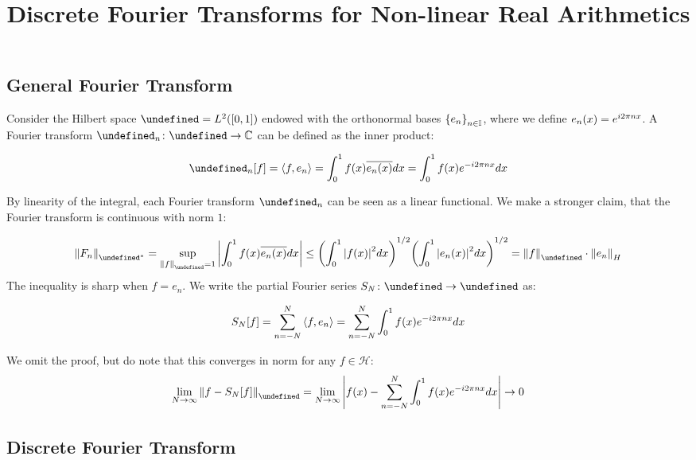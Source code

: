 \documentclass[12pt]{article}
\author{}
\title{Discrete Fourier Transforms for Non-linear Real Arithmetics}
\date{}
\let\H\undefined
\newcommand{\H}{\mathcal{H}}
\let\F\undefined
\newcommand{\F}{\mathcal{F}}
\begin{document}
\maketitle

\subsection*{General Fourier Transform}
Consider the Hilbert space $\H = L^2 \parens{\brackets{0, 1}}$ endowed with
the orthonormal bases ${\left\{e_n\right\}}_{n \in {\mathbb{I}}}$, where we define
$e_n {\left(x\right)} = e^{i 2\pi n x}$.
A Fourier transform $\type{\F_n}{\H}{\C}$ can be defined as the inner product:

\begin{align*}
  \F_n\brackets{f}
    = \inner{f, e_n}
    = \int_0^1 f\parens{x} \overline{e_n \parens{x}} dx
    = \int_0^1 f\parens{x} e^{-i 2 \pi n x} dx
\end{align*}

By linearity of the integral, each Fourier transform $\F_n$
can be seen as a linear functional.
We make a stronger claim, that the Fourier transform is continuous with
norm $1$:

\begin{align*}
  \norm{F_n}_{\adj{\H}}
    = \sup_{\norm{f}_{\H} = 1}
        \abs{\int_0^1 f\parens{x} \overline{e_n \parens{x}} dx}
    \leq \parens{\int_0^1 \abs{f\parens{x}}^2 dx}^{1/2}
              \parens{\int_0^1 \abs{e_n \parens{x}}^2 dx}^{1/2}
    = \norm{f}_{\H} \cdot \norm{e_n}_{H}
\end{align*}
The inequality is sharp when $f = e_{n}$.
We write the partial Fourier series $\type{S_N}{\H}{\H}$ as:

\begin{align*}
  S_N {\left[f\right]}
    = \sum_{n = -N}^{N} {\left\langle f, e_n\right\rangle}
    = \sum_{n = -N}^{N} \int_0^1 f(x) e^{- i 2 \pi n x} dx
\end{align*}

We omit the proof, but do note that this converges in norm for any
$f \in \mathcal{H}$:
\begin{align*}
  \lim_{N \to \infty} \norm{f - S_N \brackets{f}}_{\H}
    = \lim_{N \to \infty}
      \abs{f\parens{x} -
            \sum_{n = -N}^{N} \int_0^1 f\parens{x} e^{-i 2\pi nx} dx}
    \to 0
\end{align*}

\subsection*{Discrete Fourier Transform}
\end{document}
